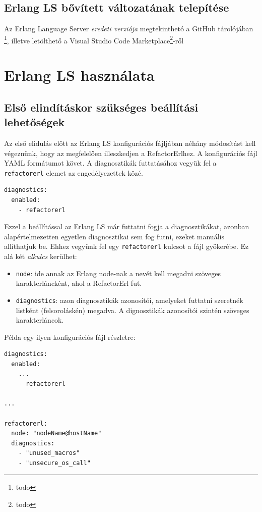 \subsection{Erlang LS bővített változatának telepítése}
Az Erlang Language Server \textit{eredeti verziója} megtekinthetó a GitHub tárolójában \footnote{todo}, illetve letölthető a Visual Studio Code Marketplace\footnote{todo}-ről 




\section{Erlang LS használata}
\subsection{Első elindításkor szükséges beállítási lehetőségek}
Az első elidulás előtt az Erlang LS konfigurációs fájljában néhány módosítást kell végeznünk, hogy az megfelelően illeszkedjen a RefactorErlhez. A konfigurációs fájl YAML formátumot követ. 
A diagnosztikák futtatásához vegyük fel a \lstinline{refactorerl} elemet az engedélyezettek közé. 

\begin{lstlisting}
diagnostics:
  enabled:
    - refactorerl
\end{lstlisting}

Ezzel a beállítással az Erlang LS már futtatni fogja a diagnosztikákat, azonban alapértelmezetten egyetlen diagnosztikai sem fog futni, ezeket manuális allíthatjuk be. Ehhez vegyünk fel egy \lstinline{refactorerl} kulcsot a fájl gyökerébe. Ez alá két \textit{alkulcs} kerülhet:
\begin{itemize}
    \item \lstinline{node}: ide annak az Erlang node-nak a nevét kell megadni szöveges karakterláncként, ahol a RefactorErl fut. 
    \item \lstinline{diagnostics}: azon diagnosztikák azonosítói, amelyeket futtatni szeretnék listként (felsoroláskén) megadva. A dignosztikák azonosítói szintén szöveges karakterláncok.
\end{itemize}

Példa egy ilyen konfigurációs fájl részletre:

\begin{lstlisting}
diagnostics:
  enabled:
    ...
    - refactorerl

...

refactorerl:
  node: "nodeName@hostName" 		
  diagnostics:
    - "unused_macros"			
    - "unsecure_os_call"
\end{lstlisting}

